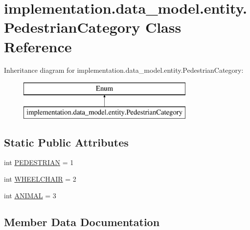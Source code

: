 \hypertarget{classimplementation_1_1data__model_1_1entity_1_1_pedestrian_category}{}\section{implementation.\+data\+\_\+model.\+entity.\+Pedestrian\+Category Class Reference}
\label{classimplementation_1_1data__model_1_1entity_1_1_pedestrian_category}
Inheritance diagram for implementation.\+data\+\_\+model.\+entity.\+Pedestrian\+Category\+:\begin{figure}[H]
\begin{center}
\leavevmode
\includegraphics[height=2.000000cm]{classimplementation_1_1data__model_1_1entity_1_1_pedestrian_category}
\end{center}
\end{figure}
\subsection*{Static Public Attributes}
\begin{DoxyCompactItemize}
\item 
int \hyperlink{classimplementation_1_1data__model_1_1entity_1_1_pedestrian_category_a3a22fc8ad35d1437a3afe6097ee4d486}{P\+E\+D\+E\+S\+T\+R\+I\+AN} = 1
\item 
int \hyperlink{classimplementation_1_1data__model_1_1entity_1_1_pedestrian_category_a90e24b7d7df9a9d382e3b990181aaecd}{W\+H\+E\+E\+L\+C\+H\+A\+IR} = 2
\item 
int \hyperlink{classimplementation_1_1data__model_1_1entity_1_1_pedestrian_category_afab4565897518ef18eb5ce72526d96cb}{A\+N\+I\+M\+AL} = 3
\end{DoxyCompactItemize}


\subsection{Member Data Documentation}
\mbox{\label{classimplementation_1_1data__model_1_1entity_1_1_pedestrian_category_afab4565897518ef18eb5ce72526d96cb}} 

